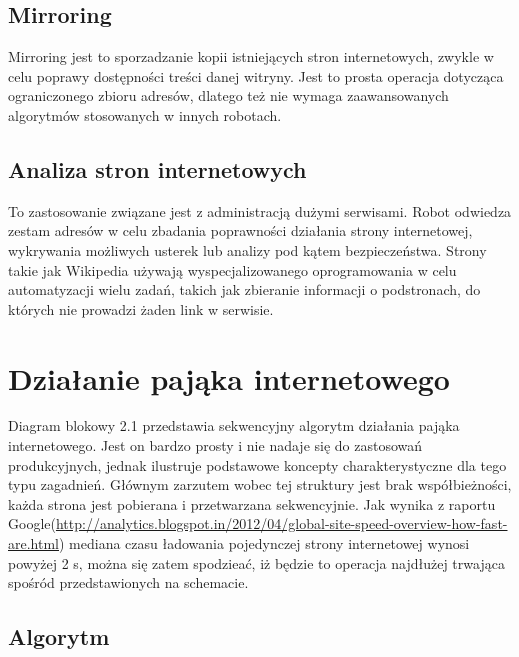 \subsection{Mirroring}
\label{subsec:mirroring}
Mirroring jest to sporzadzanie kopii istniejących stron internetowych, zwykle w celu poprawy dostępności treści danej witryny. Jest to prosta operacja dotycząca ograniczonego zbioru adresów, dlatego też nie wymaga zaawansowanych algorytmów stosowanych w innych robotach.

\subsection{Analiza stron internetowych}
\label{subsec:analizaStr}
To zastosowanie związane jest z administracją dużymi serwisami. Robot odwiedza zestam adresów w celu zbadania poprawności działania strony internetowej, wykrywania możliwych usterek lub analizy pod kątem bezpieczeństwa. Strony takie jak Wikipedia używają wyspecjalizowanego oprogramowania w celu automatyzacji wielu zadań, takich jak zbieranie informacji o podstronach, do których nie prowadzi żaden link w serwisie\cite{webCrawling}.


\section{Działanie pająka internetowego}
\label{sec:dzialaniePajaka}

Diagram blokowy 2.1 przedstawia sekwencyjny algorytm działania pająka internetowego. Jest on bardzo prosty i nie nadaje się do zastosowań produkcyjnych, jednak ilustruje podstawowe koncepty charakterystyczne dla tego typu zagadnień. Głównym zarzutem wobec tej struktury jest brak współbieżności, każda strona jest pobierana i przetwarzana sekwencyjnie. Jak wynika z raportu Google(\url{http://analytics.blogspot.in/2012/04/global-site-speed-overview-how-fast-are.html}) mediana czasu ładowania pojedynczej strony internetowej wynosi powyżej 2 s, można się zatem spodzieać, iż będzie to operacja najdłużej trwająca spośród przedstawionych na schemacie.



\subsection{Algorytm}
\label{subsec:algorytmPajaka}

